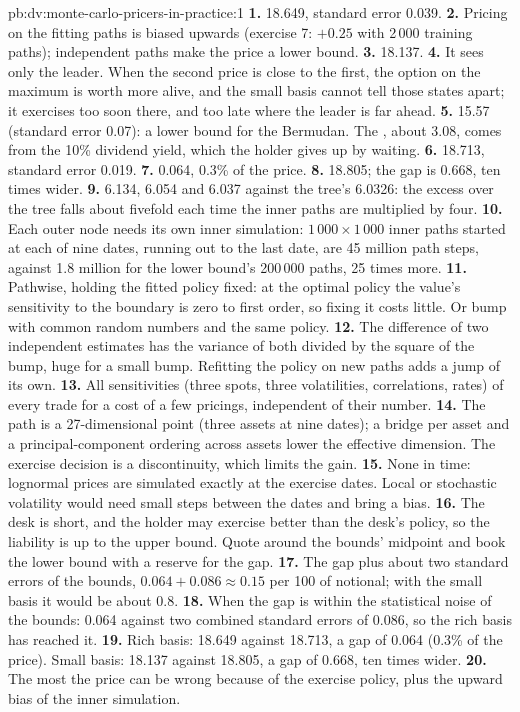 \begin{solution}{pb:dv:monte-carlo-pricers-in-practice:1}
\textbf{1.} 18.649, standard error 0.039.
\textbf{2.} Pricing on the fitting paths is biased upwards (exercise 7: $+0.25$ with 2\,000 training paths); independent paths make the price a lower bound.
\textbf{3.} 18.137.
\textbf{4.} It sees only the leader. When the second price is close to the first, the option on the maximum is worth more alive, and the small basis cannot
tell those states apart; it exercises too soon there, and too late where the leader is far ahead.
\textbf{5.} 15.57 (standard error 0.07): a lower bound for the Bermudan. The , about 3.08, comes from the 10\% dividend yield, which the
holder gives up by waiting.
\textbf{6.} 18.713, standard error 0.019.
\textbf{7.} 0.064, 0.3\% of the price.
\textbf{8.} 18.805; the gap is 0.668, ten times wider.
\textbf{9.} 6.134, 6.054 and 6.037 against the tree's 6.0326: the excess over the tree falls about fivefold each time the inner paths are multiplied by four.
\textbf{10.} Each outer node needs its own inner simulation: $1\,000\times1\,000$ inner paths started at each of nine dates, running out to the last date,
are 45 million path steps, against 1.8 million for the lower bound's 200\,000 paths, 25 times more.
\textbf{11.} Pathwise, holding the fitted policy fixed: at the optimal policy the value's sensitivity to the boundary is zero to first order, so fixing it costs
little. Or bump with common random numbers and the same policy.
\textbf{12.} The difference of two independent estimates has the variance of both divided by the square of the bump, huge for a small bump. Refitting the
policy on new paths adds a jump of its own.
\textbf{13.} All sensitivities (three spots, three volatilities, correlations, rates) of every trade for a cost of a few pricings, independent of their number.
\textbf{14.} The path is a 27-dimensional point (three assets at nine dates); a bridge per asset and a principal-component ordering across assets lower the
effective dimension. The exercise decision is a discontinuity, which limits the gain.
\textbf{15.} None in time: lognormal prices are simulated exactly at the exercise dates. Local or stochastic volatility would need small steps between the
dates and bring a bias.
\textbf{16.} The desk is short, and the holder may exercise better than the desk's policy, so the liability is up to the upper bound. Quote around the bounds'
midpoint and book the lower bound with a reserve for the gap.
\textbf{17.} The gap plus about two standard errors of the bounds, $0.064+0.086\approx0.15$ per 100 of notional; with the small basis it would be about 0.8.
\textbf{18.} When the gap is within the statistical noise of the bounds: 0.064 against two combined standard errors of 0.086, so the rich basis has reached it.
\textbf{19.} Rich basis: 18.649 against 18.713, a gap of 0.064 (0.3\% of the price). Small basis: 18.137 against 18.805, a gap of 0.668, ten times wider.
\textbf{20.} The most the price can be wrong because of the exercise policy, plus the upward bias of the inner simulation.
\end{solution}


